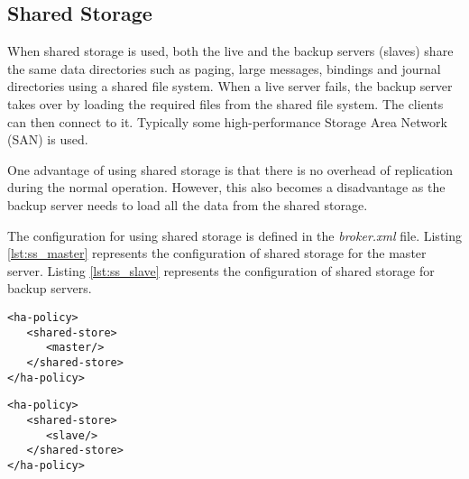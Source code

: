\subsection{Shared Storage}

When shared storage is used, both the live and the backup servers (slaves) share the same data directories such as paging, large messages, bindings and journal directories using a shared file system. When a live server fails, the backup server takes over by loading the required files from the shared file system. The clients can then connect to it. Typically some high-performance Storage Area Network (SAN) is used.

One advantage of using shared storage is that there is no overhead of replication during the normal operation. However, this also becomes a disadvantage as the backup server needs to load all the data from the shared storage.

The configuration for using shared storage is defined in the \textit{broker.xml} file. Listing \ref{lst:ss_master} represents the configuration of shared storage for the master server. Listing \ref{lst:ss_slave} represents the configuration of shared storage for backup servers.

\bigskip
\noindent\begin{minipage}{.45\columnwidth}
\begin{lstlisting}[style=XmlInputStyle,caption=HA Shared storage master, label={lst:ss_master}]
<ha-policy>
   <shared-store>
      <master/>
   </shared-store>
</ha-policy>
\end{lstlisting}
\end{minipage}\hfill
\begin{minipage}{.45\columnwidth}
\begin{lstlisting}[style=XmlInputStyle,caption=HA Shared storage slave, label={lst:ss_slave}]
<ha-policy>
   <shared-store>
      <slave/>
   </shared-store>
</ha-policy>
\end{lstlisting}
\end{minipage}
